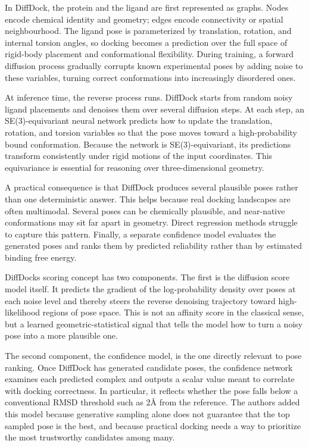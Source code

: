 In DiffDock, the protein and the ligand are first represented as graphs. Nodes encode chemical identity and geometry; edges encode connectivity or spatial neighbourhood. The ligand pose is parameterized by translation, rotation, and internal torsion angles, so docking becomes a prediction over the full space of rigid-body placement and conformational flexibility. During training, a forward diffusion process gradually corrupts known experimental poses by adding noise to these variables, turning correct conformations into increasingly disordered ones.

At inference time, the reverse process runs. DiffDock starts from random noisy ligand placements and denoises them over several diffusion steps. At each step, an SE(3)-equivariant neural network predicts how to update the translation, rotation, and torsion variables so that the pose moves toward a high-probability bound conformation. Because the network is SE(3)-equivariant, its predictions transform consistently under rigid motions of the input coordinates. This equivariance is essential for reasoning over three-dimensional geometry.

A practical consequence is that DiffDock produces several plausible poses rather than one deterministic answer. This helps because real docking landscapes are often multimodal. Several poses can be chemically plausible, and near-native conformations may sit far apart in geometry. Direct regression methods struggle to capture this pattern. Finally, a separate confidence model evaluates the generated poses and ranks them by predicted reliability rather than by estimated binding free energy.

DiffDock\textquotesingle s scoring concept has two components. The first is the diffusion score model itself. It predicts the gradient of the log-probability density over poses at each noise level and thereby steers the reverse denoising trajectory toward high-likelihood regions of pose space. This is not an affinity score in the classical sense, but a learned geometric-statistical signal that tells the model how to turn a noisy pose into a more plausible one.

The second component, the confidence model, is the one directly relevant to pose ranking. Once DiffDock has generated candidate poses, the confidence network examines each predicted complex and outputs a scalar value meant to correlate with docking correctness. In particular, it reflects whether the pose falls below a conventional RMSD threshold such as 2Å from the reference. The authors added this model because generative sampling alone does not guarantee that the top sampled pose is the best, and because practical docking needs a way to prioritize the most trustworthy candidates among many.

